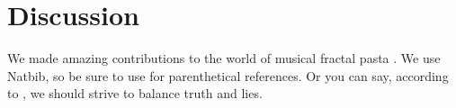\documentclass[12pt]{article}
\begin{document}
\section{Discussion} 

We made amazing contributions to the world of musical fractal pasta 
\citep{McDonald2017,Tibshirani2013}. We use Natbib, so be sure to use
\citep{Stein1981} for parenthetical references. Or you can say, according to
\citet{HastieTibshirani2009}, we should strive to balance truth and lies.


      
\end{document}
